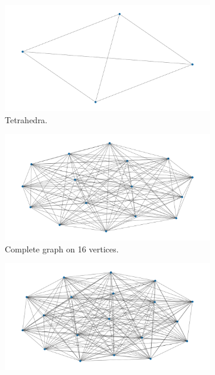 \documentclass{article}
\begin{document}
\begin{figure}[H]
    \begin{subfigure}{0.495\linewidth}
        \centering
        \includegraphics[width=\textwidth]{g4.png}
        \caption{Tetrahedra.}\label{fig:g4}
    \end{subfigure}
    \begin{subfigure}{0.495\linewidth}
        \centering
        \includegraphics[width=\textwidth]{g16.png}
        \caption{Complete graph on 16 vertices.}\label{fig:g16}
    \end{subfigure}
    \begin{subfigure}{0.495\linewidth}
        \centering
        \includegraphics[width=\textwidth]{g19.png}

\end{subfigure}
\end{figure}
\end{document}
